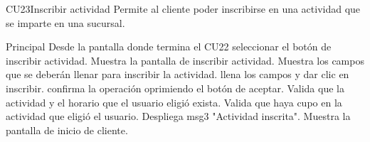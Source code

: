 

		
		
		



	\begin{UseCase}{CU23}{Inscribir actividad}{
		Permite  al cliente poder inscribirse en una actividad que se imparte en una sucursal.
	}
	\end{UseCase}
	\begin{UCtrayectoria}{Principal}
		\UCpaso[\UCactor] Desde la pantalla donde termina el CU22 seleccionar el botón de inscribir actividad.
		\UCpaso Muestra la pantalla de inscribir actividad.
		\UCpaso Muestra los campos que se deberán llenar para inscribir la actividad.
		\UCpaso[\UCactor] llena los campos y dar clic en inscribir.
		\UCpaso[\UCactor] confirma la operación oprimiendo el botón de aceptar. 
		\UCpaso Valida que la actividad y el horario que el usuario eligió exista.
		\UCpaso Valida que haya cupo en la actividad que eligió el usuario.
		\UCpaso Despliega msg3 "Actividad inscrita".
		\UCpaso Muestra la pantalla de inicio de cliente.	
	\end{UCtrayectoria}


